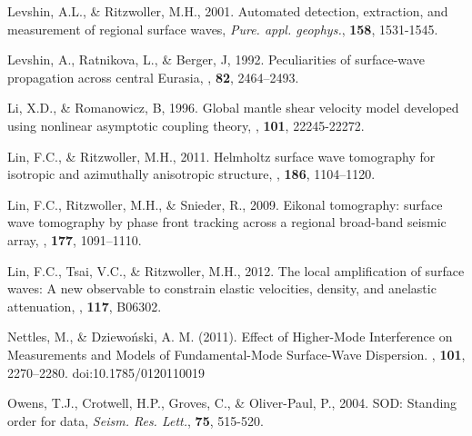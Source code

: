 \documentclass[referee]{gji}
\begin{document}
\begin{thebibliography}{}

	   Levshin, A.L., \& Ritzwoller, M.H., 2001. Automated detection, extraction, and measurement of regional surface waves, \textit{Pure. appl. geophys.}, \textbf{158}, 1531-1545.

	   Levshin, A., Ratnikova, L., \& Berger, J, 1992. Peculiarities of surface-wave propagation across central Eurasia, \textit{\bssa}, \textbf{82}, 2464–2493.

	   Li, X.D., \& Romanowicz, B, 1996. Global mantle shear velocity model developed using nonlinear asymptotic coupling theory, \textit{\jgr}, \textbf{101}, 22245-22272.

	   Lin, F.C., \& Ritzwoller, M.H., 2011. Helmholtz surface wave tomography for isotropic and azimuthally anisotropic structure, \textit{\gji}, \textbf{186}, 1104–1120.

	   Lin, F.C., Ritzwoller, M.H., \& Snieder, R., 2009. Eikonal tomography: surface wave tomography by phase front tracking across a regional broad-band seismic array, \textit{\gji}, \textbf{177}, 1091–1110. 

	   Lin, F.C., Tsai, V.C., \& Ritzwoller, M.H., 2012. The local amplification of surface waves: A new observable to constrain elastic velocities, density, and anelastic attenuation, \textit{\jgr}, \textbf{117}, B06302.

	   Nettles, M., \& Dziewoński, A. M. (2011). Effect of Higher-Mode Interference on Measurements and Models of Fundamental-Mode Surface-Wave Dispersion. \textit{\bssa}, \textbf{101}, 2270–2280. doi:10.1785/0120110019

	   Owens, T.J., Crotwell, H.P., Groves, C., \& Oliver-Paul, P., 2004. SOD: Standing order for data, \textit{Seism. Res. Lett.}, \textbf{75}, 515-520.


\end{thebibliography}
\end{document}
